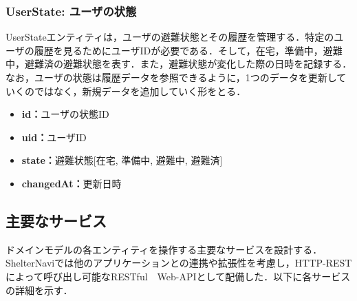 \documentclass[technicalreport,dvipdfmx]{ieicej}
\begin{document}
\subsubsection{{\bf UserState:} ユーザの状態}
UserStateエンティティは，ユーザの避難状態とその履歴を管理する．特定のユーザの履歴を見るためにユーザIDが必要である．そして，在宅，準備中，避難中，避難済の避難状態を表す．また，避難状態が変化した際の日時を記録する．なお，ユーザの状態は履歴データを参照できるように，1つのデータを更新していくのではなく，新規データを追加していく形をとる．

\begin{itemize}
     \item{\textbf{id：}}ユーザの状態ID
     \item{\textbf{uid：}}ユーザID
     \item{\textbf{state：}}避難状態[在宅, 準備中, 避難中, 避難済]
     \item{\textbf{changedAt：}}更新日時
\end{itemize}



\subsection{主要なサービス}
\label{sec:service}
ドメインモデルの各エンティティを操作する主要なサービスを設計する．
ShelterNaviでは他のアプリケーションとの連携や拡張性を考慮し，HTTP-RESTによって呼び出し可能なRESTful　Web-APIとして配備した．以下に各サービスの詳細を示す．
\end{document}
